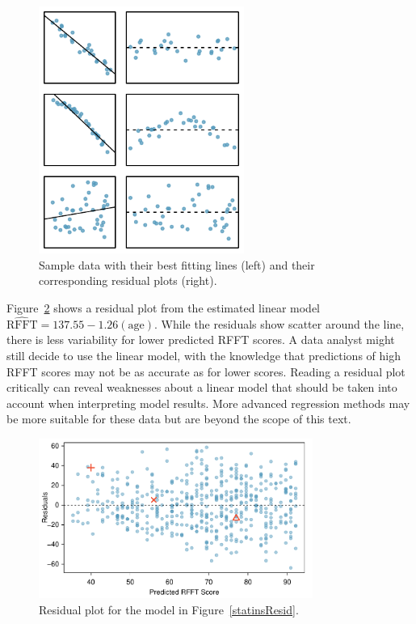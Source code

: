 \begin{figure}[h!]
\centering
\includegraphics[width=0.6\textwidth]
{ch_simple_linear_regression_oi_biostat/figures/sampleLinesAndResPlots/sampleLinesAndResPlots.pdf}
\caption{Sample data with their best fitting lines (left) and their corresponding residual plots (right).}
\label{sampleLinesAndResPlots}
\end{figure}

Figure~\ref{statinsResidualPlot} shows a residual plot from the estimated linear model $\widehat{\text{RFFT}} = 137.55 - 1.26(\text{age})$. While the residuals show scatter around the line, there is less variability for lower predicted RFFT scores. A data analyst might still decide to use the linear model, with the knowledge that predictions of high RFFT scores may not be as accurate as for lower scores. Reading a residual plot critically can reveal weaknesses about a linear model that should be taken into account when interpreting model results. More advanced regression methods may be more suitable for these data but are beyond the scope of this text.


\begin{figure}[h]
	\centering
	\includegraphics[width=0.8\textwidth]{ch_simple_linear_regression_oi_biostat/figures/statinsResidPlot/statinsResidPlot}
	\caption{Residual plot for the model in Figure~\ref{statinsResid}.}
	\label{statinsResidualPlot}
\end{figure}

